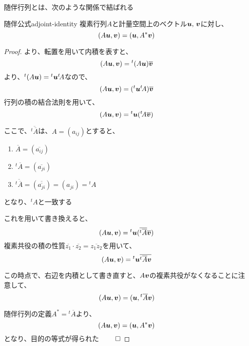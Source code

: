 \documentclass[../../../topic_linear-algebra]{subfiles}
\begin{document}
随伴行列とは、次のような関係で結ばれる

\begin{theorem}{随伴公式}{adjoint-identity}
  複素行列$A$と計量空間上のベクトル$\vb*{u},\,\vb*{v}$に対し、
  \begin{equation*}
    (A\vb*{u}, \vb*{v}) = (\vb*{u}, A^*\vb*{v})
  \end{equation*}
\end{theorem}

\begin{proof}
  より、転置を用いて内積を表すと、
  \begin{equation*}
    (A\vb*{u},\vb*{v}) = {}^t(A\vb*{u}) \overline{\vb*{v}}
  \end{equation*}
  より、${}^t(A\vb*{u}) = {}^t\vb*{u} {}^t\! A$なので、
  \begin{equation*}
    (A\vb*{u},\vb*{v}) = ({}^t\vb*{u} {}^t\! A) \overline{\vb*{v}}
  \end{equation*}
  行列の積の結合法則を用いて、
  \begin{equation*}
    (A\vb*{u},\vb*{v}) = {}^t\vb*{u} ({}^t\! A\overline{\vb*{v}})
  \end{equation*}

  ここで、$\overline{{}^t \overline{A}}$は、$A=(a_{ij})$とすると、
  \begin{enumerate}
    \item $\overline{A} = (\overline{a_{ij}})$
    \item ${}^t\overline{A} = (\overline{a_{ji}})$
    \item $\overline{{}^t\overline{A}} = (\overline{\overline{a_{ji}}}) = (a_{ji}) = {}^t A$
  \end{enumerate}
  となり、${}^t A$と一致する

  これを用いて書き換えると、
  \begin{equation*}
    (A\vb*{u},\vb*{v}) = {}^t\vb*{u} (\overline{{}^t \overline{A}} \overline{\vb*{v}})
  \end{equation*}
  複素共役の積の性質$\overline{z_1} \cdot \overline{z_2} = \overline{z_1 z_2}$を用いて、
  \begin{equation*}
    (A\vb*{u},\vb*{v}) = {}^t\vb*{u} \overline{{}^t \overline{A} \vb*{v}}
  \end{equation*}

  この時点で、右辺を内積として書き直すと、$A\vb*{v}$の複素共役がなくなることに注意して、
  \begin{equation*}
    (A\vb*{u},\vb*{v}) = (\vb*{u}, {}^t \overline{A} \vb*{v})
  \end{equation*}

  随伴行列の定義$A^* = {}^t \overline{A}$より、
  \begin{equation*}
    (A\vb*{u},\vb*{v}) = (\vb*{u}, A^* \vb*{v})
  \end{equation*}
  となり、目的の等式が得られた $\qed$
\end{proof}
\end{document}
